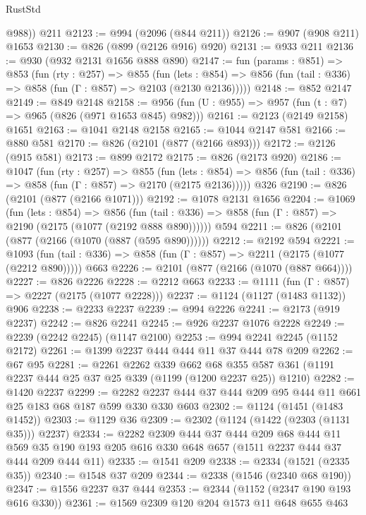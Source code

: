 \begin{lexlean}{RustStd}
\begin{coremodule}
        @988))
    @211
@2123 := @994 (@2096 (@844 @211))
@2126 := @907 (@908 @211) @1653
@2130 := @826 (@899 (@2126 @916) @920)
@2131 := @933 @211
@2136 := @930 (@932 @2131 @1656 @888 @890)
@2147 := fun (params : @851) =>
  @853
    (fun (rty : @257) =>
    @855
      (fun (lets : @854) =>
      @856 (fun (tail : @336) => @858 (fun (Γ : @857) => @2103 (@2130 @2136)))))
@2148 := @852 @2147
@2149 := @849 @2148
@2158 := @956 (fun (U : @955) => @957 (fun (t : @7) => @965 (@826 (@971 @1653 @845) @982)))
@2161 := @2123 (@2149 @2158) @1651
@2163 := @1041 @2148 @2158
@2165 := @1044 @2147 @581
@2166 := @880 @581
@2170 := @826 (@2101 (@877 (@2166 @893)))
@2172 := @2126 (@915 @581)
@2173 := @899 @2172
@2175 := @826 (@2173 @920)
@2186 := @1047
    (fun (rty : @257) =>
    @855
      (fun (lets : @854) =>
      @856 (fun (tail : @336) => @858 (fun (Γ : @857) => @2170 (@2175 @2136)))))
    @326
@2190 := @826 (@2101 (@877 (@2166 @1071)))
@2192 := @1078 @2131 @1656
@2204 := @1069
    (fun (lets : @854) =>
    @856 (fun (tail : @336) => @858 (fun (Γ : @857) => @2190 (@2175 (@1077 (@2192 @888 @890))))))
    @594
@2211 := @826 (@2101 (@877 (@2166 (@1070 (@887 (@595 @890))))))
@2212 := @2192 @594
@2221 := @1093
    (fun (tail : @336) => @858 (fun (Γ : @857) => @2211 (@2175 (@1077 (@2212 @890)))))
    @663
@2226 := @2101 (@877 (@2166 (@1070 (@887 @664))))
@2227 := @826 @2226
@2228 := @2212 @663
@2233 := @1111 (fun (Γ : @857) => @2227 (@2175 (@1077 @2228)))
@2237 := @1124 (@1127 (@1483 @1132)) @906
@2238 := @2233 @2237
@2239 := @994 @2226
@2241 := @2173 (@919 @2237)
@2242 := @826 @2241
@2245 := @926 @2237 @1076 @2228
@2249 := @2239 (@2242 @2245) (@1147 @2100)
@2253 := @994 @2241 @2245 (@1152 @2172)
@2261 := @1399 @2237 @444 @444 @11 @37 @444 @78 @209
@2262 := @67 @95
@2281 := @2261
    @2262
    @339
    @662
    @68
    @355
    @587
    @361
    (@1191 @2237 @444 @25 @37 @25 @339 (@1199 (@1200 @2237 @25)) @1210)
@2282 := @1420 @2237
@2299 := @2282 @2237 @444 @37 @444 @209 @95 @444 @11 @661 @25 @183 @68 @187 @599 @330 @330 @603
@2302 := @1124 (@1451 (@1483 @1452))
@2303 := @1129 @36
@2309 := @2302 (@1124 (@1422 (@2303 (@1131 @35))) @2237)
@2334 := @2282
    @2309
    @444
    @37
    @444
    @209
    @68
    @444
    @11
    @569
    @35
    @190
    @193
    @205
    @616
    @330
    @648
    @657
    (@1511 @2237 @444 @37 @444 @209 @444 @11)
@2335 := @1541 @209
@2338 := @2334 (@1521 (@2335 @35))
@2340 := @1548 @37 @209
@2344 := @2338 (@1546 (@2340 @68 @190))
@2347 := @1556 @2237 @37 @444
@2353 := @2344 (@1152 (@2347 @190 @193 @616 @330))
@2361 := @1569 @2309 @120 @204 @1573 @11 @648 @655 @463

\end{coremodule}
\end{lexlean}
